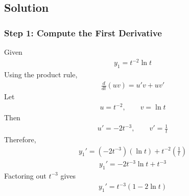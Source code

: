 \documentclass[letterpaper,10pt,english]{sphinxmanual}
\begin{document}
\subsection{Solution}
\label{\detokenize{Language/Science_language/ODE_calculus/course_MATH_3035/homework_assignments/index_pdf:solution}}

\subsubsection{Step 1: Compute the First Derivative}
\label{\detokenize{Language/Science_language/ODE_calculus/course_MATH_3035/homework_assignments/index_pdf:step-1-compute-the-first-derivative}}
\sphinxAtStartPar
Given
\begin{equation*}
\begin{split}y_1=t^{-2}\ln t\end{split}
\end{equation*}
\sphinxAtStartPar
Using the product rule,
\begin{equation*}
\begin{split}\frac{d}{dt}(uv)=u'v+uv'\end{split}
\end{equation*}
\sphinxAtStartPar
Let
\begin{equation*}
\begin{split}u=t^{-2},
\qquad
v=\ln t\end{split}
\end{equation*}
\sphinxAtStartPar
Then
\begin{equation*}
\begin{split}u'=-2t^{-3},
\qquad
v'=\frac{1}{t}\end{split}
\end{equation*}
\sphinxAtStartPar
Therefore,
\begin{equation*}
\begin{split}y_1'
=
(-2t^{-3})(\ln t)
+
t^{-2}\left(\frac{1}{t}\right)\end{split}
\end{equation*}\begin{equation*}
\begin{split}y_1'
=
-2t^{-3}\ln t+t^{-3}\end{split}
\end{equation*}
\sphinxAtStartPar
Factoring out \(t^{-3}\) gives
\begin{equation*}
\begin{split}y_1'
=
t^{-3}(1-2\ln t)\end{split}
\end{equation*}
\end{document}
